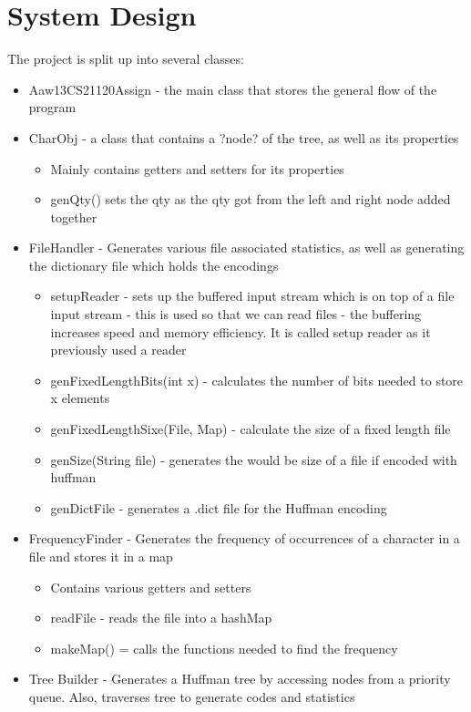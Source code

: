 \documentclass[11pt, oneside]{amsart}
\begin{document}
\section{System Design}
	The project is split up into several classes:
	\begin{itemize}
		\item Aaw13CS21120Assign - the main class that stores the general flow of the program
		\item CharObj - a class that contains a ?node? of the tree, as well as its properties
		\begin{itemize}
			\item Mainly contains getters and setters for its properties
			\item genQty() sets the qty as the qty got from the left and right node added together
		\end{itemize}
		\item FileHandler - Generates various file associated statistics, as well as generating the dictionary file which holds the encodings
		\begin{itemize}
			\item setupReader - sets up the buffered input stream which is on top of a file input stream - this is used so that we can read files - the buffering increases speed and memory efficiency. It is called setup reader as it previously used a reader
			\item genFixedLengthBits(int x) - calculates the number of bits needed to store x elements
			\item genFixedLengthSixe(File, Map) - calculate the size of a fixed length file
			\item genSize(String file) - generates the would be size of a file if encoded with huffman
			\item genDictFile - generates a .dict file for the Huffman encoding
		\end{itemize}
		\item FrequencyFinder - Generates the frequency of occurrences of a character in a file and stores it in a map
		\begin{itemize}
			\item Contains various getters and setters
			\item readFile - reads the file into a hashMap
			\item makeMap() = calls the functions needed to find the frequency
		\end{itemize}
		\item Tree Builder - Generates a Huffman tree by accessing nodes from a priority queue. Also, traverses tree to generate codes and statistics

\end{itemize}
\end{document}
